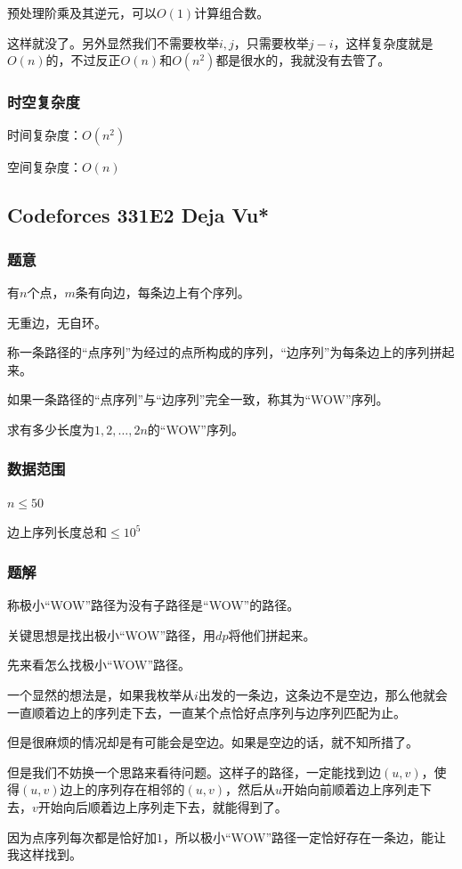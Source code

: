 \documentclass{ctexart}
\begin{document}
预处理阶乘及其逆元，可以$O(1)$计算组合数。

这样就没了。另外显然我们不需要枚举$i,j$，只需要枚举$j-i$，这样复杂度就是$O(n)$的，不过反正$O(n)$和$O(n^2)$都是很水的，我就没有去管了。
\subsubsection{时空复杂度}
时间复杂度：$O(n^2)$

空间复杂度：$O(n)$
\subsection{Codeforces 331E2 Deja Vu*}
\subsubsection{题意}
有$n$个点，$m$条有向边，每条边上有个序列。

无重边，无自环。

称一条路径的“点序列”为经过的点所构成的序列，“边序列”为每条边上的序列拼起来。

如果一条路径的“点序列”与“边序列”完全一致，称其为“WOW”序列。

求有多少长度为$1,2,\ldots,2n$的“WOW”序列。
\subsubsection{数据范围}
$n \le 50$

边上序列长度总和$\le 10^5$
\subsubsection{题解}
称极小“WOW”路径为没有子路径是“WOW”的路径。

关键思想是找出极小“WOW”路径，用$dp$将他们拼起来。

先来看怎么找极小“WOW”路径。

一个显然的想法是，如果我枚举从$i$出发的一条边，这条边不是空边，那么他就会一直顺着边上的序列走下去，一直某个点恰好点序列与边序列匹配为止。

但是很麻烦的情况却是有可能会是空边。如果是空边的话，就不知所措了。

但是我们不妨换一个思路来看待问题。这样子的路径，一定能找到边$(u,v)$，使得$(u,v)$边上的序列存在相邻的$(u,v)$，然后从$u$开始向前顺着边上序列走下去，$v$开始向后顺着边上序列走下去，就能得到了。

因为点序列每次都是恰好加$1$，所以极小“WOW”路径一定恰好存在一条边，能让我这样找到。
\end{document}
